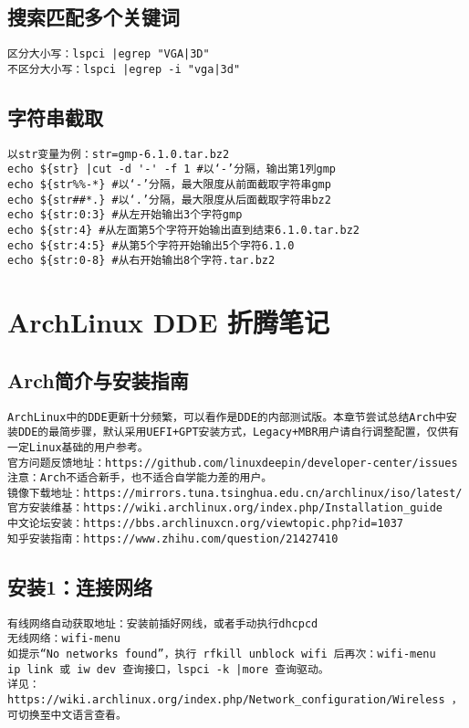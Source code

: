\documentclass[a4paper,fontset=fandol,zihao=-4,linespread=1.2,oneside]{ctexbook}
\begin{document}
\section{搜索匹配多个关键词}
\begin{lstlisting}
区分大小写：lspci |egrep "VGA|3D"
不区分大小写：lspci |egrep -i "vga|3d"
\end{lstlisting}

\section{字符串截取}
\begin{lstlisting}
以str变量为例：str=gmp-6.1.0.tar.bz2
echo ${str} |cut -d '-' -f 1 #以‘-’分隔，输出第1列gmp
echo ${str%%-*} #以‘-’分隔，最大限度从前面截取字符串gmp
echo ${str##*.} #以‘.’分隔，最大限度从后面截取字符串bz2
echo ${str:0:3} #从左开始输出3个字符gmp
echo ${str:4} #从左面第5个字符开始输出直到结束6.1.0.tar.bz2
echo ${str:4:5} #从第5个字符开始输出5个字符6.1.0
echo ${str:0-8} #从右开始输出8个字符.tar.bz2
\end{lstlisting}


\chapter{ArchLinux DDE 折腾笔记}

\section{Arch简介与安装指南}
\begin{lstlisting}
ArchLinux中的DDE更新十分频繁，可以看作是DDE的内部测试版。本章节尝试总结Arch中安装DDE的最简步骤，默认采用UEFI+GPT安装方式，Legacy+MBR用户请自行调整配置，仅供有一定Linux基础的用户参考。
官方问题反馈地址：https://github.com/linuxdeepin/developer-center/issues
注意：Arch不适合新手，也不适合自学能力差的用户。
镜像下载地址：https://mirrors.tuna.tsinghua.edu.cn/archlinux/iso/latest/
官方安装维基：https://wiki.archlinux.org/index.php/Installation_guide
中文论坛安装：https://bbs.archlinuxcn.org/viewtopic.php?id=1037
知乎安装指南：https://www.zhihu.com/question/21427410
\end{lstlisting}

\section{安装1：连接网络}
\begin{lstlisting}
有线网络自动获取地址：安装前插好网线，或者手动执行dhcpcd
无线网络：wifi-menu
如提示“No networks found”，执行 rfkill unblock wifi 后再次：wifi-menu
ip link 或 iw dev 查询接口，lspci -k |more 查询驱动。
详见：https://wiki.archlinux.org/index.php/Network_configuration/Wireless ，可切换至中文语言查看。
\end{lstlisting}
\end{document}
